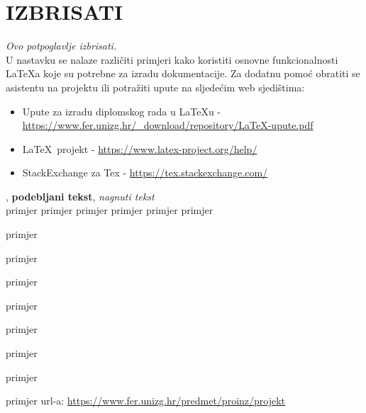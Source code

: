 		\section{IZBRISATI}
		
		\textit{Ovo potpoglavlje izbrisati.}\\

		U nastavku se nalaze različiti primjeri kako koristiti osnovne funkcionalnosti \LaTeX a koje su potrebne za izradu dokumentacije. Za dodatnu pomoć obratiti se asistentu na projektu ili potražiti upute na sljedećim web sjedištima:
		\begin{itemize}
			\item Upute za izradu diplomskog rada u \LaTeX u - \url{https://www.fer.unizg.hr/_download/repository/LaTeX-upute.pdf}
			\item \LaTeX\ projekt - \url{https://www.latex-project.org/help/}
			\item StackExchange za Tex - \url{https://tex.stackexchange.com/}\\
		
		\end{itemize} 	


		
		\noindent {}, \textbf{podebljani tekst}, 	\textit{nagnuti tekst}\\
		\noindent \normalsize primjer \large primjer \Large primjer \LARGE {primjer} \huge {primjer} \Huge primjer \normalsize
				
		\begin{packed_item}
			
			\item  primjer
			\item  primjer
			\item  primjer
			\item[] \begin{packed_enum}
				\item primjer
				\item[] \begin{packed_enum}
					\item[1.a] primjer
					\item[b] primjer
				\end{packed_enum}
				\item primjer
			\end{packed_enum}
			
		\end{packed_item}
		
		\noindent primjer url-a: \url{https://www.fer.unizg.hr/predmet/proinz/projekt}
		
